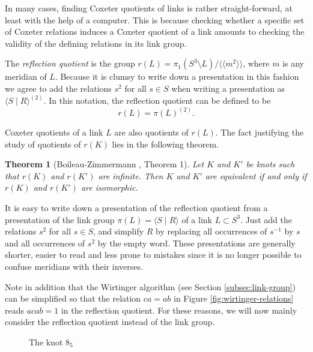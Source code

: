 \documentclass{article}
\newtheorem{theorem}{Theorem}[section]
\theoremstyle{definition}
\begin{document}
In many cases, finding Coxeter quotients of links is rather straight-forward, at least with the help of a computer. This is because checking whether a specific set of Coxeter relations induces a Coxeter quotient of a link amounts to checking the validity of the defining relations in its link group.

The \textit{reflection quotient} is the group $r(L) = \pi_1(S^3 \setminus L) / \langle \langle m^2 \rangle \rangle$, where $m$ is any meridian of $L$. Because it is clumsy to write down a presentation in this fashion we agree to add the relations $s^2$ for all $s \in S$ when writing a presentation as $\langle S \; | \; R \rangle^{(2)}$. In this notation, the reflection quotient can be defined to be
$$r(L) = \pi(L)^{(2)}.$$

Coxeter quotients of a link $L$ are also quotients of $r(L)$. The fact justifying the study of quotients of $r(K)$ lies in the following theorem.

\begin{theorem}[Boileau-Zimmermann \cite{boileau1989}, Theorem 1]
Let $K$ and $K'$ be knots such that $r(K)$ and $r(K')$ are infinite. Then $K$ and $K'$ are equivalent if and only if $r(K)$ and $r(K')$ are isomorphic.
\end{theorem}

It is easy to write down a presentation of the reflection quotient from a presentation of the link group $\pi(L) = \langle S \; | \; R \rangle$ of a link $L \subset S^3$. Just add the relations $s^2$ for all $s \in S$, and simplify $R$ by replacing all occurrences of $s^{-1}$ by $s$ and all occurrences of $s^2$ by the empty word. These presentations are generally shorter, easier to read and less prone to mistakes since it is no longer possible to confuse meridians with their inverses.

Note in addition that the Wirtinger algorithm (see Section \ref{subsec:link-group}) can be simplified so that the relation $ca = ab$ in Figure \ref{fig:wirtinger-relations} reads $acab = 1$ in the reflection quotient.
For these reasons, we will now mainly consider the reflection quotient instead of the link group.


\begin{figure}[ht]
\centering
{}
\caption{The knot $8_5$}
\label{fig:8-5}
\end{figure}
\end{document}
